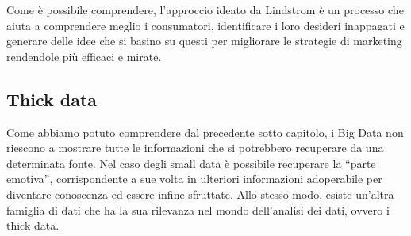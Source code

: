 Come è possibile comprendere, l’approccio ideato da Lindstrom è un processo che aiuta a comprendere meglio i consumatori, identificare i loro desideri inappagati e generare delle idee che si basino su questi per migliorare le strategie di marketing rendendole più efficaci e mirate.

\subsection{Thick data}

Come abbiamo potuto comprendere dal precedente sotto capitolo, i Big Data non riescono a mostrare tutte le informazioni che si potrebbero recuperare da una determinata fonte. Nel caso degli small data è possibile recuperare la “parte emotiva”, corrispondente a sue volta in ulteriori informazioni adoperabile per diventare conoscenza ed essere infine sfruttate. Allo stesso modo, esiste un’altra famiglia di dati che ha la sua rilevanza nel mondo dell’analisi dei dati, ovvero i thick data.

